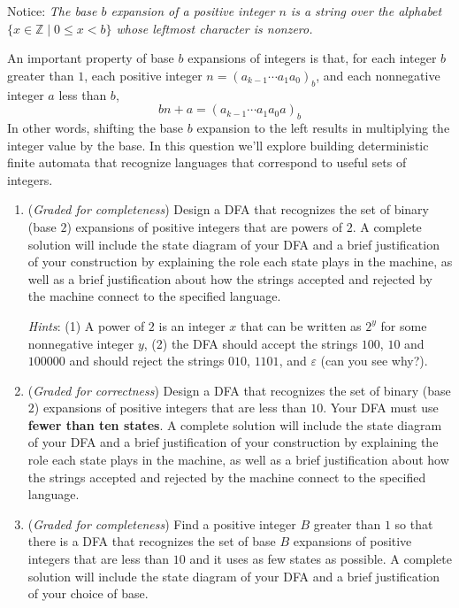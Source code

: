 \documentclass[12pt, oneside]{article}
\newcommand{\gradeCorrect}{({\it Graded for correctness}) }
\newcommand{\gradeComplete}{({\it Graded for completeness}) }
\newcommand{\st}{\mid}
\begin{document}
\begin{enumerate}[wide, labelwidth=!, labelindent=0pt]
Notice: {\it The base $b$ expansion of a positive integer $n$ is a string over the alphabet 
$\{x \in \mathbb{Z} \st 0 \leq x < b\}$
whose leftmost character is nonzero.}

An important property of base $b$ expansions of integers is that, for each integer $b$ greater than $1$,
each positive integer $n = (a_{k-1} \cdots a_1 a_0)_b$, and each nonnegative integer $a$ less than $b$, 
\[
    bn + a = (a_{k-1} \cdots a_1 a_0a)_b
\]
In other words, shifting the base $b$ expansion to the left results in multiplying the integer value by the base.
In this question we'll explore building deterministic finite automata that recognize 
languages that correspond to useful sets of integers.

    \begin{enumerate}
    \item\gradeComplete Design a DFA that recognizes the set of binary (base $2$) expansions of 
    positive integers that are powers of $2$. A complete solution will include the state diagram of your DFA and 
    a brief justification 
    of your construction by explaining the role each state plays in the machine, as well as a brief 
    justification about how the strings accepted and rejected by the machine connect to the specified language.

    {\it Hints}: (1) A power of $2$ is an integer $x$ that can be written as $2^y$ for some nonnegative integer $y$, 
    (2) the DFA should accept the strings $100$, $10$ and $100000$ and should reject the 
    strings $010$, $1101$, and $\varepsilon$ (can you see why?).

    \item\gradeCorrect Design a DFA that recognizes the set of 
    binary (base $2$) expansions of positive integers that are less than $10$. Your DFA must use {\bf fewer than ten states}. 
    A complete solution will include the state diagram of your DFA and 
    a brief justification 
    of your construction by explaining the role each state plays in the machine, as well as a brief 
    justification about how the strings accepted and rejected by the machine connect to the specified language.

    \item \gradeComplete Find a positive integer $B$ greater than $1$ so that 
    there is a DFA that recognizes the set of 
    base $B$ expansions of positive integers that are less than $10$ and it 
    uses as few states as possible. A complete solution will include the state 
    diagram of your DFA and 
    a brief justification of your choice of base.
        


\end{enumerate}
\end{enumerate}
\end{document}
